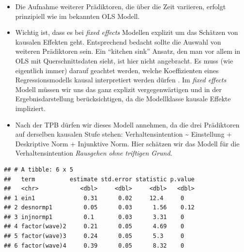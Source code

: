 \documentclass[]{book}
\newenvironment{Shaded}{\begin{snugshade}}{\end{snugshade}}
\newcommand{\DataTypeTok}[1]{\textcolor[rgb]{0.13,0.29,0.53}{#1}}
\newcommand{\DecValTok}[1]{\textcolor[rgb]{0.00,0.00,0.81}{#1}}
\newcommand{\KeywordTok}[1]{\textcolor[rgb]{0.13,0.29,0.53}{\textbf{#1}}}
\newcommand{\NormalTok}[1]{#1}
\newcommand{\OperatorTok}[1]{\textcolor[rgb]{0.81,0.36,0.00}{\textbf{#1}}}
\newcommand{\StringTok}[1]{\textcolor[rgb]{0.31,0.60,0.02}{#1}}
\begin{document}
\begin{itemize}
\item
  Die Aufnahme weiterer Prädiktoren, die über die Zeit variieren, erfolgt prinzipiell wie im bekannten OLS Modell.
\item
  Wichtig ist, dass es bei \emph{fixed effects} Modellen explizit um das Schätzen von kausalen Effekten geht. Entsprechend bedacht sollte die Auswahl von weiteren Prädiktoren sein. Ein ``kitchen sink'' Ansatz, den man vor allem in OLS mit Querschnittsdaten sieht, ist hier nicht angebracht. Es muss (wie eigentlich immer) darauf geachtet werden, welche Koeffizienten eines Regressionsmodells kausal interpretiert werden dürfen \citep{keeleCausalInterpretationEstimated2019}. Im \emph{fixed effects} Modell müssen wir uns das ganz explizit vergegenwärtigen und in der Ergebnisdarstellung berücksichtigen, da die Modellklasse kausale Effekte impliziert.
\item
  Nach der TPB dürfen wir dieses Modell annehmen, da die drei Prädiktoren auf derselben kausalen Stufe stehen: Verhaltensintention \textasciitilde{} Einstellung + Deskriptive Norm + Injunktive Norm. Hier schätzen wir das Modell für die Verhaltensintention \emph{Rausgehen ohne triftigen Grund}.
\end{itemize}

\begin{Shaded}
\end{Shaded}

\begin{verbatim}
## # A tibble: 6 x 5
##   term          estimate std.error statistic p.value
##   <chr>            <dbl>     <dbl>     <dbl>   <dbl>
## 1 ein1              0.31      0.02     12.4     0   
## 2 desnormp1         0.05      0.03      1.56    0.12
## 3 injnormp1         0.1       0.03      3.31    0   
## 4 factor(wave)2     0.21      0.05      4.69    0   
## 5 factor(wave)3     0.24      0.05      5.3     0   
## 6 factor(wave)4     0.39      0.05      8.32    0
\end{verbatim}
\end{document}
